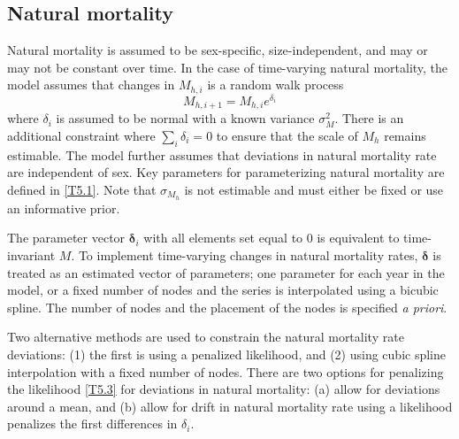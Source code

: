 \documentclass[12pt,letterpaper]{article}
\begin{document}

    \subsection*{Natural mortality} %
    \label{sub:natural_mortality}
    Natural mortality is assumed to be sex-specific, size-independent, and may or may not be constant over time.  In the case of time-varying natural mortality, the model assumes that changes in $M_{h,i}$ is a random walk process 
    \[M_{h,i+1} = M_{h,i} e^{\delta_{i}}\]
    where $\delta_i$ is assumed to be normal with a known variance $\sigma^2_M$. There is an additional constraint where $\sum_i \delta_i = 0$ to ensure that the scale of $M_h$ remains estimable. The model further assumes that deviations in natural mortality rate are independent of sex.  Key parameters for parameterizing natural mortality are defined in \eqref{T5.1}.  Note that $\sigma_{M_h}$ is not estimable and must either be fixed or use an informative prior.

    The parameter vector $\bm{\delta}_i$ with all elements set equal to 0 is equivalent to time-invariant $M$. To implement time-varying changes in natural mortality rates,  $\bm{\delta}$ is treated as an estimated vector of parameters; one parameter for each year in the model, or a fixed number of nodes and the series is interpolated using a bicubic spline. The number of nodes and the placement of the nodes is specified \emph{a priori}.

    Two alternative methods are used to constrain the natural mortality rate deviations: (1) the first is using a penalized likelihood, and (2) using cubic spline interpolation with a fixed number of nodes. There are two options for penalizing the likelihood \eqref{T5.3} for deviations in natural mortality: (a) allow for deviations around a mean, and (b) allow for drift in natural mortality rate using a likelihood penalizes the first differences in $\delta_i$.
\end{document}
